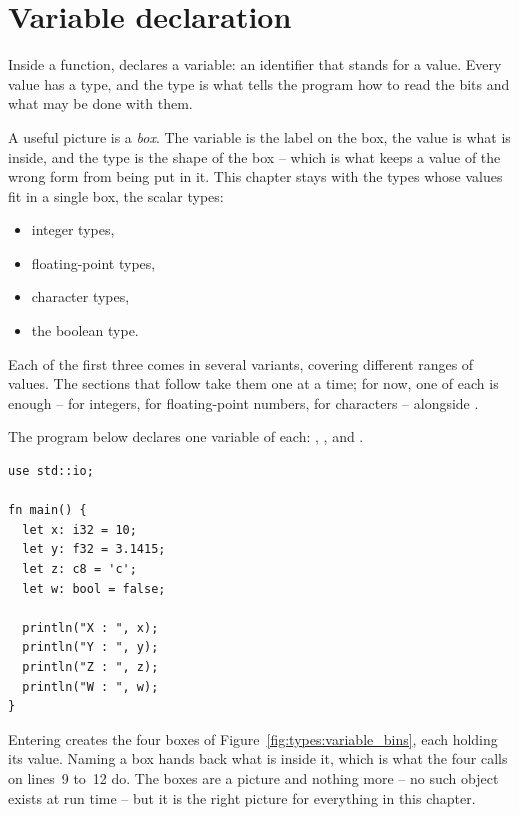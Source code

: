 \vfill\pagebreak
\section{Variable declaration}
\label{sec:types:variable_declaration}

Inside a function,  declares a variable: an identifier that stands for
a value. Every value has a type, and the type is what tells the program how to
read the bits and what may be done with them.

A useful picture is a \textit{box}. The variable is the label on the box, the
value is what is inside, and the type is the shape of the box -- which is what
keeps a value of the wrong form from being put in it. This chapter stays with the
types whose values fit in a single box, the scalar types:

\vspace{-10pt}%
\begin{itemize}
\setlength\itemsep{0.2mm}
\item integer types,
\item floating-point types,
\item character types,
\item the boolean type.
\end{itemize}\vspace{-10pt}%

Each of the first three comes in several variants, covering different ranges of
values. The sections that follow take them one at a time; for now, one of each is
enough --  for integers,  for floating-point numbers,
 for characters -- alongside .

The program below declares one variable of each: , , 
and .

\begin{lstlisting}[style=coloredverbatim, caption=simple variable declaration, label=lst:types:basic_variables]
use std::io;

fn main() {
  let x: i32 = 10;
  let y: f32 = 3.1415;
  let z: c8 = 'c';
  let w: bool = false;

  println("X : ", x);
  println("Y : ", y);
  println("Z : ", z);
  println("W : ", w);
}
\end{lstlisting}



Entering  creates the four boxes of
Figure~\ref{fig:types:variable_bins}, each holding its value. Naming a box hands
back what is inside it, which is what the four  calls on lines~9
to~12 do. The boxes are a picture and nothing more -- no such object exists at
run time -- but it is the right picture for everything in this chapter.

